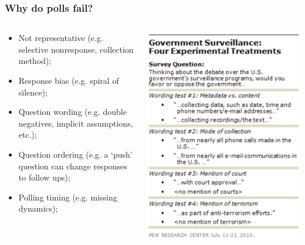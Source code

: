 \documentclass[aspectratio=169]{beamer}
\theoremstyle{principle}
\begin{document}
\begin{frame}
\frametitle{Why do polls fail?}

\begin{columns}
\begin{column}{0.5\textwidth}

\begin{itemize}
\item Not representative (e.g. selective nonresponse, collection method);
\bigskip

\item Response bias (e.g. spiral of silence);
\bigskip

\item Question wording (e.g. double negatives, implicit assumptions, etc.);
\bigskip

\item Question ordering (e.g. a `push' question can change responses to follow ups);
\bigskip

\item Polling timing (e.g. missing dynamics);

\end{itemize}

\end{column}
\begin{column}{0.5\textwidth}
\begin{center}
\includegraphics[scale=0.5]{pew_1.png}
\end{center}
\end{column}
\end{columns}

\end{frame}
\end{document}
